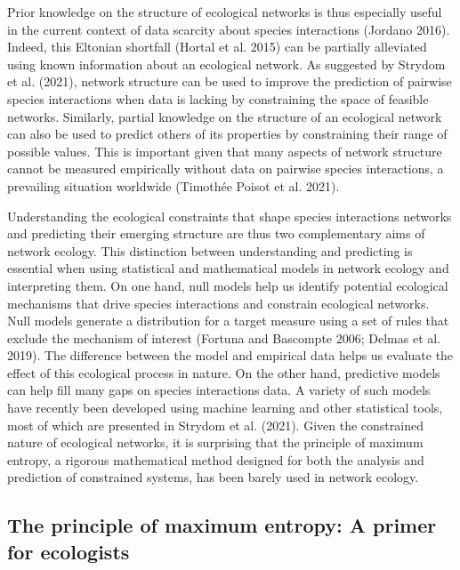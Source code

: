\documentclass[10pt,oneside]{article}
\begin{document}
Prior knowledge on the structure of ecological networks is thus
especially useful in the current context of data scarcity about species
interactions (Jordano 2016). Indeed, this Eltonian shortfall (Hortal et
al. 2015) can be partially alleviated using known information about an
ecological network. As suggested by Strydom et al. (2021), network
structure can be used to improve the prediction of pairwise species
interactions when data is lacking by constraining the space of feasible
networks. Similarly, partial knowledge on the structure of an ecological
network can also be used to predict others of its properties by
constraining their range of possible values. This is important given
that many aspects of network structure cannot be measured empirically
without data on pairwise species interactions, a prevailing situation
worldwide (Timothée Poisot et al. 2021).

Understanding the ecological constraints that shape species interactions
networks and predicting their emerging structure are thus two
complementary aims of network ecology. This distinction between
understanding and predicting is essential when using statistical and
mathematical models in network ecology and interpreting them. On one
hand, null models help us identify potential ecological mechanisms that
drive species interactions and constrain ecological networks. Null
models generate a distribution for a target measure using a set of rules
that exclude the mechanism of interest (Fortuna and Bascompte 2006;
Delmas et al. 2019). The difference between the model and empirical data
helps us evaluate the effect of this ecological process in nature. On
the other hand, predictive models can help fill many gaps on species
interactions data. A variety of such models have recently been developed
using machine learning and other statistical tools, most of which are
presented in Strydom et al. (2021). Given the constrained nature of
ecological networks, it is surprising that the principle of maximum
entropy, a rigorous mathematical method designed for both the analysis
and prediction of constrained systems, has been barely used in network
ecology.

\hypertarget{the-principle-of-maximum-entropy-a-primer-for-ecologists}{%
\subsection{The principle of maximum entropy: A primer for
ecologists}\label{the-principle-of-maximum-entropy-a-primer-for-ecologists}}
\end{document}
